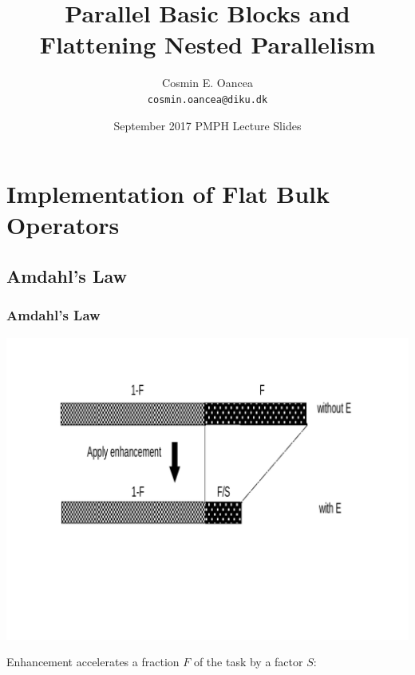 \documentclass{beamer}
\title[Intro]{Parallel Basic Blocks and\\ Flattening Nested Parallelism}
\author[C.~Oancea]{Cosmin E. Oancea\\{\tt cosmin.oancea@diku.dk}}
\institute{Department of Computer Science (DIKU)\\University of Copenhagen}
\date[Sept 2017]{September 2017 PMPH Lecture Slides}
\begin{document}
\titleslide


\begin{frame}[fragile]
	\tableofcontents
\end{frame}



\section{Implementation of Flat Bulk Operators}

\subsection{Amdahl's Law}

\begin{frame}[fragile,t]
\frametitle{Amdahl's Law}
\vspace{-5ex}
\includegraphics[width=47ex]{Figures/L1/Amdhal}
\vspace{-7ex}

Enhancement accelerates a fraction $F$ of the task by a factor $S$:\bigskip

\bigskip


\end{frame}
\end{document}
